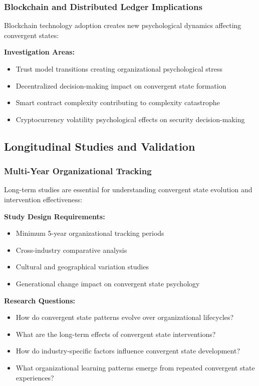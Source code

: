 \documentclass[11pt,a4paper]{article}
\begin{document}
\subsubsection{Blockchain and Distributed Ledger Implications}

Blockchain technology adoption creates new psychological dynamics affecting convergent states:

\textbf{Investigation Areas:}
\begin{itemize}
\item Trust model transitions creating organizational psychological stress
\item Decentralized decision-making impact on convergent state formation
\item Smart contract complexity contributing to complexity catastrophe
\item Cryptocurrency volatility psychological effects on security decision-making
\end{itemize}

\subsection{Longitudinal Studies and Validation}

\subsubsection{Multi-Year Organizational Tracking}

Long-term studies are essential for understanding convergent state evolution and intervention effectiveness:

\textbf{Study Design Requirements:}
\begin{itemize}
\item Minimum 5-year organizational tracking periods
\item Cross-industry comparative analysis
\item Cultural and geographical variation studies
\item Generational change impact on convergent state psychology
\end{itemize}

\textbf{Research Questions:}
\begin{itemize}
\item How do convergent state patterns evolve over organizational lifecycles?
\item What are the long-term effects of convergent state interventions?
\item How do industry-specific factors influence convergent state development?
\item What organizational learning patterns emerge from repeated convergent state experiences?
\end{itemize}
\end{document}
